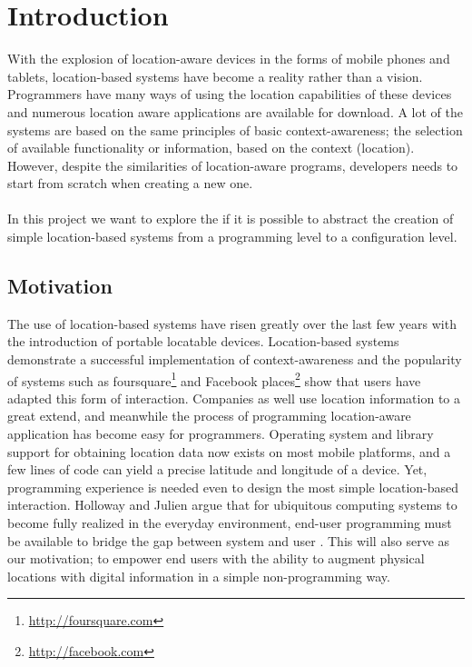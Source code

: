 
\section{Introduction}
\label{sec.introduction}
With the explosion of location-aware devices in the forms of mobile phones and tablets, location-based systems have become a reality rather than a vision. Programmers have many ways of using the location capabilities of these devices and numerous location aware applications are available for download. A lot of the systems are based on the same principles of basic context-awareness; the selection of available functionality or information, based on the context (location). However, despite the similarities of location-aware programs, developers needs to start from scratch when creating a new one. 
\\\\
In this project we want to explore the if it is possible to abstract the creation of simple location-based systems from a programming level to a configuration level.


\subsection{Motivation} %
\label{sub:context_and_motivation}
The use of location-based systems have risen greatly over the last few years with the introduction of portable locatable devices. Location-based systems demonstrate a successful implementation of context-awareness and the popularity of systems such as foursquare\footnote{\url{http://foursquare.com}} and Facebook places\footnote{\url{http://facebook.com}} show that users have adapted this form of interaction. Companies as well use location information to a great extend, and meanwhile the process of programming location-aware application has become easy for programmers. Operating system and library support for obtaining location data now exists on most mobile platforms, and a few lines of code can yield a precise latitude and longitude of a device. Yet, programming experience is needed even to design the most simple location-based interaction. Holloway and Julien argue that for ubiquitous computing systems to become fully realized in the everyday environment, end-user programming must be available to bridge the gap between system and user \cite{Holloway:2010:CEP:1882362.1882398}. This will also serve as our motivation; to empower end users with the ability to augment physical locations with digital information in a simple non-programming way.

